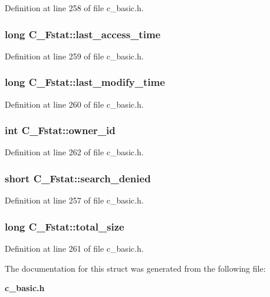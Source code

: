 Definition at line 258 of file c\_\-basic.h.
\subsubsection{\setlength{\rightskip}{0pt plus 5cm}long \bf{C\_\-Fstat::last\_\-access\_\-time}}\label{structC__Fstat_71ec5ab758d080b056e4121ab1d381fa}




Definition at line 259 of file c\_\-basic.h.
\subsubsection{\setlength{\rightskip}{0pt plus 5cm}long \bf{C\_\-Fstat::last\_\-modify\_\-time}}\label{structC__Fstat_3d888a4278aec94ea1fcd80a87cac40b}




Definition at line 260 of file c\_\-basic.h.
\subsubsection{\setlength{\rightskip}{0pt plus 5cm}int \bf{C\_\-Fstat::owner\_\-id}}\label{structC__Fstat_9b32f739b247cd98fddf43cdae8c15c6}




Definition at line 262 of file c\_\-basic.h.
\subsubsection{\setlength{\rightskip}{0pt plus 5cm}short \bf{C\_\-Fstat::search\_\-denied}}\label{structC__Fstat_de096123e05cf4ef92b054e10e0f5646}




Definition at line 257 of file c\_\-basic.h.
\subsubsection{\setlength{\rightskip}{0pt plus 5cm}long \bf{C\_\-Fstat::total\_\-size}}\label{structC__Fstat_8735cc2c8f7f92fcff5c16b4d1cf4bbd}




Definition at line 261 of file c\_\-basic.h.

The documentation for this struct was generated from the following file:\begin{CompactItemize}
\item 
\bf{c\_\-basic.h}\end{CompactItemize}
